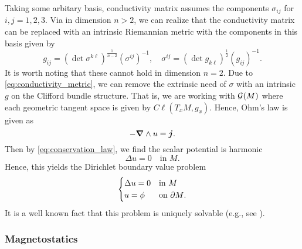 Taking some arbitary basis, conductivity matrix assumes the components $\sigma_{ij}$ for $i,j=1,2,3$.  Via \cite{uhlmann_inverse_2014} in dimension $n>2$, we can realize that the conductivity matrix can be replaced with an intrinsic Riemannian metric with the components in this basis given by
\begin{equation}
\label{eq:conductivity_metric}
    g_{ij} = (\det \sigma^{k\ell} )^{\frac{1}{n-2}} (\sigma^{ij})^{-1}, \quad \sigma^{ij} = (\det g_{k\ell})^{\frac{1}{2}} (g_{ij})^{-1}.
\end{equation}
It is worth noting that these cannot hold in dimension $n=2$. Due to \cref{eq:conductivity_metric}, we can remove the extrinsic need of $\sigma$ with an intrinsic $g$ on the Clifford bundle structure. That is, we are working with $\mathcal{G}(M)$ where each geometric tangent space is given by $C\ell(T_xM,g_x)$. Hence, Ohm's law is given as
\begin{equation}
-\boldsymbol{\nabla} \wedge u = \boldsymbol{j}.
\end{equation}
Then by \cref{eq:conservation_law}, we find the scalar potential is harmonic
\begin{equation}
\Delta u = 0 \quad \textrm{in $M$}.
\end{equation}
Hence, this yields the Dirichlet boundary value problem
\begin{equation}
\label{eq:dirichlet_problem}
\begin{cases}
\Delta u = 0 & \textrm{in $M$}\\
u = \phi & \textrm{on ${\partial M}$}.
\end{cases}
\end{equation}
It is a well known fact that this problem is uniquely solvable (e.g., see \cite[Theorem 3.4.6]{schwarz_hodge_1995}).

\subsubsection{Magnetostatics}

